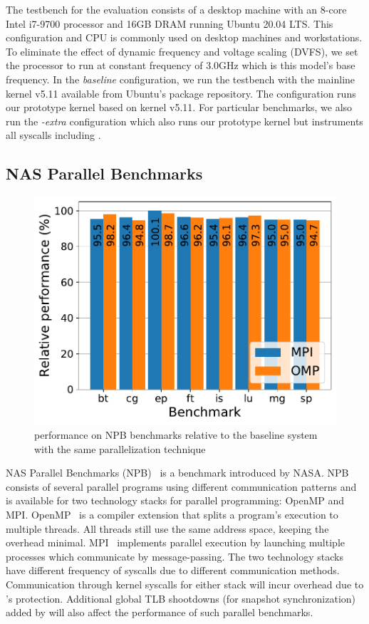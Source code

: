 \documentclass[letterpaper,twocolumn,10pt, anonymous]{article}
\begin{document}
The testbench for the evaluation consists of a desktop machine 
with an 8-core Intel i7-9700 processor and 16GB DRAM running 
Ubuntu 20.04 LTS. This configuration and CPU is commonly used on desktop
machines and workstations.
%
To eliminate the effect of dynamic frequency and voltage 
scaling (DVFS), we set the processor to run at constant 
frequency of 3.0GHz which is this model's base frequency.
In the \emph{baseline} configuration, we run the testbench 
with the mainline kernel v5.11 available from Ubuntu's package 
repository.
The \emph{\tiktok} configuration runs our prototype \tiktok kernel 
based on kernel v5.11.
For particular benchmarks, we also run the \emph{\tiktok-extra}
configuration which also runs our prototype \tiktok kernel
but instruments all syscalls including .


\subsection{NAS Parallel Benchmarks}

\begin{figure}[]
  \includegraphics[width=\linewidth]{img/npb_performance.pdf}
  \caption{\tiktok performance on NPB benchmarks relative to the baseline 
          system with the same parallelization technique}
  \label{fig:npb_performance}
\end{figure}

NAS Parallel Benchmarks (NPB)~\cite{npb} is a benchmark introduced by
NASA. 
NPB consists of several parallel programs using different communication
patterns and is available for two technology stacks for parallel programming:
OpenMP and MPI.
OpenMP~\cite{dagum1998openmp} is a compiler extension that splits a 
program's execution to multiple threads. 
All threads still use the same address space, keeping the overhead minimal. 
MPI~\cite{snir1998mpi} implements parallel execution by launching multiple
processes which communicate by message-passing. 
The two technology stacks have different frequency of syscalls due to 
different communication methods.
Communication through kernel syscalls for either stack will incur overhead
due to \tiktok's protection.
Additional global TLB shootdowns (for snapshot synchronization) added by \tiktok will also affect the 
performance of such parallel benchmarks.
\end{document}
